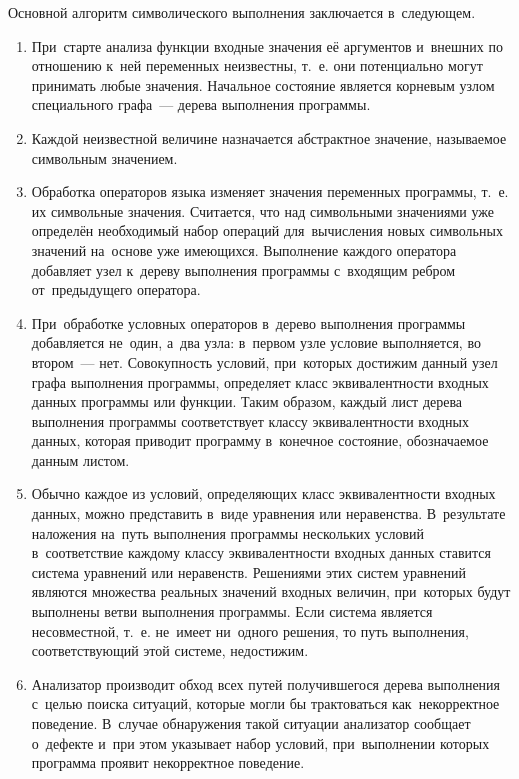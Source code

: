 Основной алгоритм символического выполнения \cite{king76} заключается в~следующем.
\begin{enumerate}
 \item При~старте анализа функции входные значения её аргументов и~внешних по отношению к~ней переменных неизвестны, т.~е. они потенциально могут принимать любые значения. Начальное состояние является корневым узлом специального графа~--- дерева выполнения программы.
 \item Каждой неизвестной величине назначается абстрактное значение, называемое символьным значением.
 \item Обработка операторов языка изменяет значения переменных программы, т.~е. их символьные значения. Считается, что над символьными значениями уже определён необходимый набор операций для~вычисления новых символьных значений на~основе уже имеющихся. Выполнение каждого оператора добавляет узел к~дереву выполнения программы с~входящим ребром от~предыдущего оператора.
 \item При~обработке условных операторов в~дерево выполнения программы добавляется не~один, а~два узла: в~первом узле условие выполняется, во втором~--- нет. Совокупность условий, при~которых достижим данный узел графа выполнения программы, определяет класс эквивалентности входных данных программы или функции. Таким образом, каждый лист дерева выполнения программы соответствует классу эквивалентности входных данных, которая приводит программу в~конечное состояние, обозначаемое данным листом. 
 \item Обычно каждое из условий, определяющих класс эквивалентности входных данных, можно представить в~виде уравнения или неравенства. В~результате наложения на~путь выполнения программы нескольких условий в~соответствие каждому классу эквивалентности входных данных ставится система уравнений или неравенств. Решениями этих систем уравнений являются множества реальных значений входных величин, при~которых будут выполнены ветви выполнения программы. Если система является несовместной, т.~е. не~имеет ни~одного решения, то путь выполнения, соответствующий этой системе, недостижим.
 \item Анализатор производит обход всех путей получившегося дерева выполнения с~целью поиска ситуаций, которые могли бы трактоваться как~некорректное поведение. В~случае обнаружения такой ситуации анализатор сообщает о~дефекте и~при этом указывает набор условий, при~выполнении которых программа проявит некорректное поведение.
\end{enumerate}


